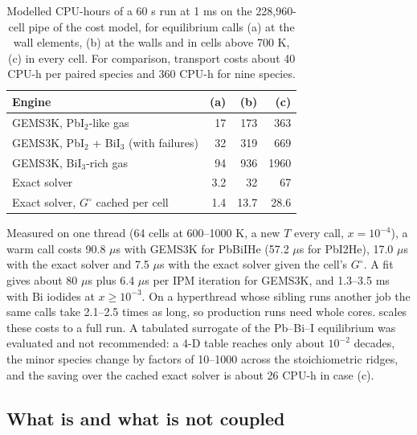 \documentclass[11pt,a4paper]{article}
\begin{document}
\begin{table}[tb]
\centering
\caption{Modelled CPU-hours of a 60 s run at 1 ms on the 228,960-cell
pipe of the cost model, for equilibrium calls (a) at the wall elements,
(b) at the walls and in cells above 700 K, (c) in every cell. For
comparison, transport costs about 40 CPU-h per paired species and
360 CPU-h for nine species.}
\label{tab:cost}
\small
\begin{tabular}{lrrr}
\toprule
Engine & (a) & (b) & (c)\\
\midrule
GEMS3K, PbI$_2$-like gas & 17 & 173 & 363\\
GEMS3K, PbI$_2$ + BiI$_3$ (with failures) & 32 & 319 & 669\\
GEMS3K, BiI$_3$-rich gas & 94 & 936 & 1960\\
Exact solver & 3.2 & 32 & 67\\
Exact solver, $G^\circ$ cached per cell & 1.4 & 13.7 & 28.6\\
\bottomrule
\end{tabular}
\end{table}

Measured on one thread (64 cells at 600--1000 K, a new $T$ every call,
$x=10^{-4}$), a warm call costs 90.8 $\mu$s with GEMS3K for PbBiIHe
(57.2 $\mu$s for PbI2He), 17.0 $\mu$s with the exact solver and 7.5
$\mu$s with the exact solver given the cell's $G^\circ$. A fit gives
about 80 $\mu$s plus 6.4 $\mu$s per IPM iteration for GEMS3K, and 1.3--3.5 ms with Bi
iodides at $x\ge10^{-3}$. On a hyperthread whose sibling runs another
job the same calls take 2.1--2.5 times as long, so production runs need
whole cores.  scales these costs to a full run. A tabulated surrogate of the Pb--Bi--I equilibrium was
evaluated and not recommended: a 4-D table reaches only about $10^{-2}$
decades, the minor species change by factors of 10--1000 across the
stoichiometric ridges, and the saving over the cached exact solver is
about 26 CPU-h in case (c).

\subsection{What is and what is not coupled}
\end{document}
